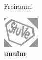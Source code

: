 
\thispagestyle{empty}
\null\vfill
\begin{center}
	Freiraum!
\end{center}
\clearpage
\thispagestyle{empty}
\null
\vspace{16.5cm}
\begin{center}
	\includegraphics[keepaspectratio, width=5em]{./grafiken/stuve_logo_gedreht-leicht_grau.png}\\
	\textcolor{black!40}{\large \textbf{uuulm}}
\end{center}
